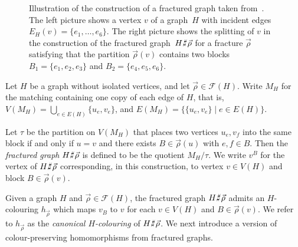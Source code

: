 \documentclass[authorcolumns,numberwithinsect]{no-lipics-v2022}
\def\fracture#1#2{\ensuremath{#1\raisebox{.2ex}{\rotatebox[origin=c]{-15}{$\sharp$}}#2}}
\def\fracture#1#2{\ensuremath{#1\raisebox{.2ex}{\rotatebox[origin=c]{-15}{$\sharp$}}#2}}
\begin{document}
\begin{figure}[t!]
    \caption{\label{fig:fracture} Illustration of the construction of a
        fractured graph taken from~\cite{PeyerimhoffRSSVW23}. The left picture shows a vertex $v$ of a graph~$H$ with incident
        edges $E_H(v)=\{e_1,\dots,e_6\}$.
The right
        picture shows the splitting of $v$ in the construction of the fractured
        graph~$\fracture{H}{\vec{\rho}}$ for a fracture $\vec{\rho}$ satisfying that the partition
        $\vec{\rho}(v)$ contains two blocks $B_1 =\{e_1,e_2,e_3\}$ and $B_2=\{e_4,e_5,e_6\}$.
}
\end{figure}

\begin{definition}[Fractured graphs $\fracture{H}{\vec{\rho}}$]\label{def:fract_graph}
 Let $H$ be a graph without isolated vertices, and let $\vec{\rho}\in\mathcal{F}(H)$. Write $M_H$ for the matching containing one copy of each edge of $H$, that is, $V(M_H)=\bigcup_{e \in E(H)}\{u_e,v_e\}$, and $E(M_H)= \{\{u_e,v_e\} \mid e \in E(H)\}$.

 Let $\tau$ be the partition on $V(M_H)$ that places two vertices $u_e,v_f$ into the same block if and only if $u=v$ and there exists $B\in \vec{\rho}(u)$ with $e,f \in B$. Then the \emph{fractured graph} $\fracture{H}{\vec{\rho}}$ is defined to be the quotient $M_H/\tau$. We write $v^B$ for the vertex of $\fracture{H}{\vec{\rho}}$ corresponding, in this construction, to vertex $v\in V(H)$ and block $B\in \vec{\rho}(v)$. 
\end{definition}


Given a graph $H$ and $\vec{\rho}\in\mathcal{F}(H)$, the fractured graph $\fracture{H}{\vec{\rho}}$ admits an $H$-colouring $h_{\vec{\rho}}$ which maps $v_B$ to $v$ for each $v\in V(H)$ and $B \in \vec{\rho}(v)$. We refer to $h_{\vec{\rho}}$ as the \emph{canonical $H$-colouring} of $\fracture{H}{\vec{\rho}}$. We next introduce a version of colour-preserving homomorphisms from fractured graphs.
\end{document}
